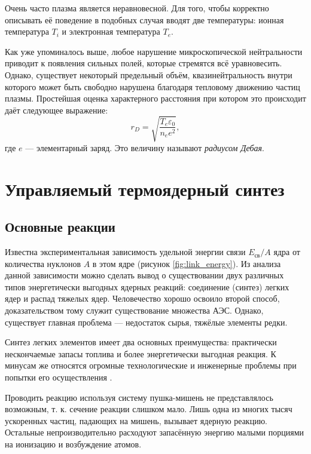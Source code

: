 Очень часто плазма является неравновесной. Для того, чтобы корректно описывать её поведение в подобных случая вводят две температуры: ионная температура $T_i$ и электронная температура $T_e$.

Как уже упоминалось выше, любое нарушение микроскопической нейтральности приводит к появления сильных полей, которые стремятся всё уравновесить. Однако, существует некоторый предельный объём, квазинейтральность внутри которого может быть свободно нарушена благодаря тепловому движению частиц плазмы. Простейшая оценка характерного расстояния при котором это происходит даёт следующее выражение:
\begin{equation}
r_D = \sqrt{\frac{T_e \varepsilon_0}{n_e e^2}},
\end{equation}
где $e$ --- элементарный заряд. Это величину называют \textit{радиусом Дебая}.

\section{Управляемый термоядерный синтез}

\subsection{Основные реакции}

Известна \cite{sivuhin5} экспериментальная зависимость удельной энергии связи $E_{\text{св}}/A$ ядра от количества нуклонов $A$ в этом ядре (рисунок \ref{fig:link_energy}).  Из анализа данной зависимости можно сделать вывод о существовании двух различных типов энергетически выгодных ядерных реакций: соединение (синтез) легких ядер и распад тяжелых ядер. Человечество хорошо освоило второй способ, доказательством тому служит существование множества АЭС. Однако, существует главная проблема --- недостаток сырья, тяжёлые элементы редки.

Синтез легких элементов имеет два основных преимущества: практически нескончаемые запасы топлива и более энергетически выгодная реакция. К минусам же относятся огромные технологические и инженерные проблемы при попытки его осуществления \cite{lukyanov}.

Проводить реакцию используя систему пушка-мишень не представлялось возможным, т. к. сечение реакции слишком мало. Лишь одна из многих тысяч ускоренных  частиц, падающих на мишень, вызывает ядерную реакцию. Остальные непроизводительно расходуют запасённую энергию малыми порциями на ионизацию и возбуждение атомов.

